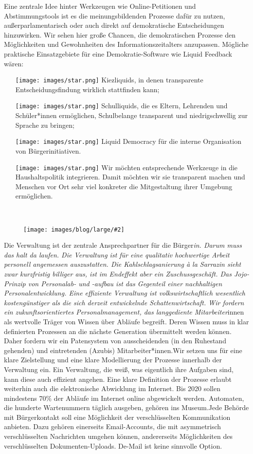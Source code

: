 \documentclass[a4paper,10pt]{article}
\newcommand{\mysection}[1]{{\vspace{1cm}\noindent\color{gray}{\ttfamily\LARGE\raggedright #1}\\\medskip}}
\newcommand{\abschnitt}[2]{%
\mysection{\raggedright #1}%
\begin{figure}[t]%
\vspace*{-2.7cm}%
\hspace*{-2.1cm}%
\texttt{[image: images/blog/large/\#2]} %
\end{figure}%
}
\begin{document}
Eine zentrale Idee hinter Werkzeugen wie Online-Petitionen und
Abstimmungstools ist es die meinungsbildenden Prozesse dafür zu nutzen,
außerparlamentarisch oder auch direkt auf demokratische Entscheidungen
hinzuwirken. Wir sehen hier große Chancen, die demokratischen Prozesse
den Möglichkeiten und Gewohnheiten des Informationszeitalters
anzupassen. Mögliche praktische Einsatzgebiete für eine
Demokratie-Software wie Liquid Feedback wären:

\begin{itemize}
\itemsep1pt\parskip0pt
\item[\texttt{[image: images/star.png]}]
  Kiezliquids, in denen transparente Entscheidungsfindung wirklich
  stattfinden kann;
\item[\texttt{[image: images/star.png]}]
  Schulliquids, die es Eltern, Lehrenden und Schüler*innen ermöglichen,
  Schulbelange transparent und niedrigschwellig zur Sprache zu bringen;
\item[\texttt{[image: images/star.png]}]
  Liquid Democracy für die interne Organisation von Bürgerinitiativen.
\item[\texttt{[image: images/star.png]}]
  Wir möchten entsprechende Werkzeuge in die Haushaltspolitik
  integrieren. Damit möchten wir sie transparent machen und Menschen vor
  Ort sehr viel konkreter die Mitgestaltung ihrer Umgebung ermöglichen.
\end{itemize}

\clearpage
\abschnitt{Verwaltung}{GefahrengebietTermine.png}

\enlargethispage{2\baselineskip}
Die Verwaltung ist der zentrale Ansprechpartner für die Bürger\emph{in.
Darum muss das halt da laufen. Die Verwaltung ist für eine qualitativ
hochwertige Arbeit personell angemessen auszustatten. Die
Kahlschlagsanierung à la Sarrazin sieht zwar kurzfristig billiger aus,
ist im Endeffekt aber ein Zuschussgeschäft. Das Jojo-Prinzip von
Personalab- und -aufbau ist das Gegenteil einer nachhaltigen
Personalentwicklung. Eine effiziente Verwaltung ist volkswirtschaftlich
wesentlich kostengünstiger als die sich derzeit entwickelnde
Schattenwirtschaft. Wir fordern ein zukunftsorientiertes
Personalmanagement, das langgediente Mitarbeiter}innen als wertvolle
Träger von Wissen über Abläufe begreift. Deren Wissen muss in klar
definierten Prozessen an die nächste Generation übermittelt werden
können. Daher fordern wir ein Patensystem von ausscheidenden (in den
Ruhestand gehenden) und eintretenden (Azubis) Mitarbeiter*innen.Wir
setzen uns für eine klare Zielstellung und eine klare Modellierung der
Prozesse innerhalb der Verwaltung ein. Ein Verwaltung, die weiß, was
eigentlich ihre Aufgaben sind, kann diese auch effizient angehen. Eine
klare Definition der Prozesse erlaubt weiterhin auch die elektronische
Abwicklung im Internet. Bis 2020 sollen mindestens 70\% der Abläufe im
Internet online abgewickelt werden. Automaten, die hunderte Wartenummern
täglich ausgeben, gehören ins Museum.Jede Behörde mit Bürgerkontakt soll
eine Möglichkeit der verschlüsselten Kommunikation anbieten. Dazu
gehören einerseits Email-Accounts, die mit asymmetrisch verschlüsselten
Nachrichten umgehen können, andererseits Möglichkeiten des
verschlüsselten Dokumenten-Uploads. De-Mail ist keine sinnvolle Option.
\end{document}
